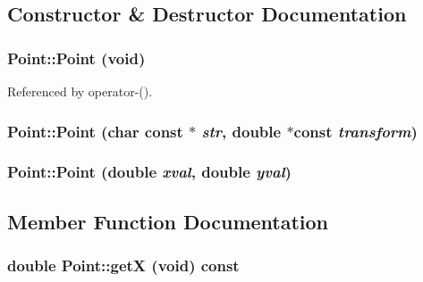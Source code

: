 \subsection{Constructor \& Destructor Documentation}
\hypertarget{classPoint_94dc19d9beda0018169bd5ef8cd730c3}{
\subsubsection[Point]{\setlength{\rightskip}{0pt plus 5cm}Point::Point (void)}}
\label{classPoint_94dc19d9beda0018169bd5ef8cd730c3}




Referenced by operator-().\hypertarget{classPoint_2a6d8ce5866c8d0e4e5c9d659ce6bfc2}{
\subsubsection[Point]{\setlength{\rightskip}{0pt plus 5cm}Point::Point (char const $\ast$ {\em str}, \/  double $\ast$const  {\em transform})}}
\label{classPoint_2a6d8ce5866c8d0e4e5c9d659ce6bfc2}


\hypertarget{classPoint_25ceb467297fed76765cde5c9ff20fa4}{
\subsubsection[Point]{\setlength{\rightskip}{0pt plus 5cm}Point::Point (double {\em xval}, \/  double {\em yval})}}
\label{classPoint_25ceb467297fed76765cde5c9ff20fa4}




\subsection{Member Function Documentation}
\hypertarget{classPoint_b73ba91268c3d3b783fd2a0983066b38}{
\subsubsection[getX]{\setlength{\rightskip}{0pt plus 5cm}double Point::getX (void) const}}
\label{classPoint_b73ba91268c3d3b783fd2a0983066b38}




